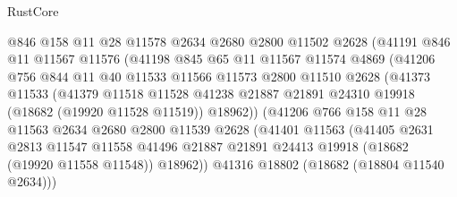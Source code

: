 \begin{lexlean}{RustCore}
\begin{coremodule}
                      @846
                      @158
                      @11
                      @28
                      @11578
                      @2634
                      @2680
                      @2800
                      @11502
                      @2628
                      (@41191
                        @846
                        @11
                        @11567
                        @11576
                        (@41198
                          @845
                          @65
                          @11
                          @11567
                          @11574
                          @4869
                          (@41206
                            @756
                            @844
                            @11
                            @40
                            @11533
                            @11566
                            @11573
                            @2800
                            @11510
                            @2628
                            (@41373
                              @11533
                              (@41379
                                @11518
                                @11528
                                @41238
                                @21887
                                @21891
                                @24310
                                @19918
                                (@18682 (@19920 @11528 @11519))
                                @18962))
                            (@41206
                              @766
                              @158
                              @11
                              @28
                              @11563
                              @2634
                              @2680
                              @2800
                              @11539
                              @2628
                              (@41401
                                @11563
                                (@41405
                                  @2631
                                  @2813
                                  @11547
                                  @11558
                                  @41496
                                  @21887
                                  @21891
                                  @24413
                                  @19918
                                  (@18682 (@19920 @11558 @11548))
                                  @18962))
                              @41316
                              @18802
                              (@18682 (@18804 @11540 @2634)))

\end{coremodule}
\end{lexlean}

